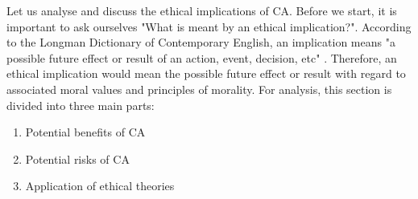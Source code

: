 %


Let us analyse and discuss the ethical implications of CA. Before we start, it is important to ask ourselves "What is meant by an ethical implication?". According to the Longman Dictionary of Contemporary English, an implication means "a possible future effect or result of an action, event, decision, etc" \cite{Longman_dic}. Therefore, an ethical implication would mean the possible future effect or result with regard to associated moral values and principles of morality. For analysis, this section is divided into three main parts: 

\begin{enumerate}
	\item Potential benefits of CA
	\item Potential risks of CA
	\item Application of ethical theories 
\end{enumerate}

